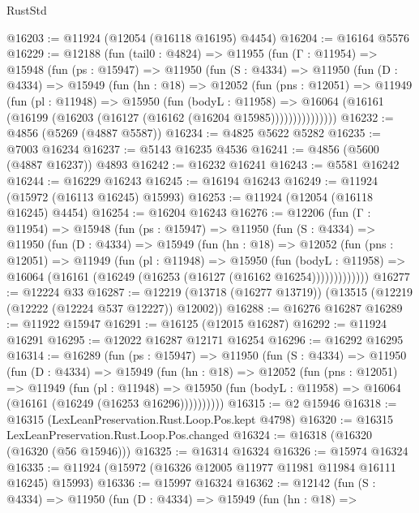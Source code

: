 \begin{lexlean}{RustStd}
\begin{coremodule}
@16203 := @11924 (@12054 (@16118 @16195) @4454)
@16204 := @16164 @5576
@16229 := @12188
    (fun (tail0 : @4824) =>
    @11955
      (fun (Γ : @11954) =>
      @15948
        (fun (ps : @15947) =>
        @11950
          (fun (S : @4334) =>
          @11950
            (fun (D : @4334) =>
            @15949
              (fun (hn : @18) =>
              @12052
                (fun (pns : @12051) =>
                @11949
                  (fun (pl : @11948) =>
                  @15950
                    (fun (bodyL : @11958) =>
                    @16064 (@16161 (@16199 (@16203 (@16127 (@16162 (@16204 @15985)))))))))))))))
@16232 := @4856 (@5269 (@4887 @5587))
@16234 := @4825 @5622 @5282
@16235 := @7003 @16234
@16237 := @5143 @16235 @4536
@16241 := @4856 (@5600 (@4887 @16237)) @4893
@16242 := @16232 @16241
@16243 := @5581 @16242
@16244 := @16229 @16243
@16245 := @16194 @16243
@16249 := @11924 (@15972 (@16113 @16245) @15993)
@16253 := @11924 (@12054 (@16118 @16245) @4454)
@16254 := @16204 @16243
@16276 := @12206
    (fun (Γ : @11954) =>
    @15948
      (fun (ps : @15947) =>
      @11950
        (fun (S : @4334) =>
        @11950
          (fun (D : @4334) =>
          @15949
            (fun (hn : @18) =>
            @12052
              (fun (pns : @12051) =>
              @11949
                (fun (pl : @11948) =>
                @15950
                  (fun (bodyL : @11958) =>
                  @16064 (@16161 (@16249 (@16253 (@16127 (@16162 @16254)))))))))))))
@16277 := @12224 @33
@16287 := @12219 (@13718 (@16277 @13719)) (@13515 (@12219 (@12222 (@12224 @537 @12227)) @12002))
@16288 := @16276 @16287
@16289 := @11922 @15947
@16291 := @16125 (@12015 @16287)
@16292 := @11924 @16291
@16295 := @12022 @16287 @12171 @16254
@16296 := @16292 @16295
@16314 := @16289
    (fun (ps : @15947) =>
    @11950
      (fun (S : @4334) =>
      @11950
        (fun (D : @4334) =>
        @15949
          (fun (hn : @18) =>
          @12052
            (fun (pns : @12051) =>
            @11949
              (fun (pl : @11948) =>
              @15950 (fun (bodyL : @11958) => @16064 (@16161 (@16249 (@16253 @16296))))))))))
@16315 := @2 @15946
@16318 := @16315 (LexLeanPreservation.Rust.Loop.Pos.kept @4798)
@16320 := @16315 LexLeanPreservation.Rust.Loop.Pos.changed
@16324 := @16318 (@16320 (@16320 (@56 @15946)))
@16325 := @16314 @16324
@16326 := @15974 @16324
@16335 := @11924 (@15972 (@16326 @12005 @11977 @11981 @11984 @16111 @16245) @15993)
@16336 := @15997 @16324
@16362 := @12142
    (fun (S : @4334) =>
    @11950
      (fun (D : @4334) =>
      @15949
        (fun (hn : @18) =>

\end{coremodule}
\end{lexlean}
